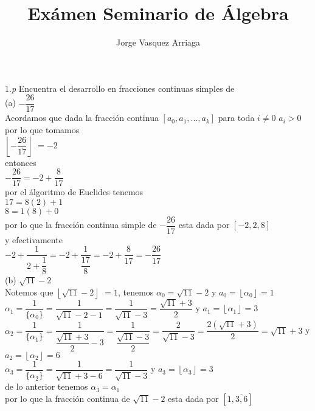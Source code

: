 \documentclass[11pt, article]{memoir}
\title{Exámen Seminario de Álgebra }
\author{Jorge Vasquez Arriaga}
\date{}
\begin{document}
\maketitle

1.\textit{p} Encuentra el desarrollo en fracciones continuas simples de \\

(a) $-\dfrac{26}{17}$\\

Acordamos que dada la fracción continua $[a_{0}, a_{1}, ..., a_{k}]$  para toda  $i\not=0$ $a_{i}>0$\\
por lo que tomamos \\
$\left\lfloor -\dfrac{26}{17} \right\rfloor$ $=-2$\\
entonces\\
$-\dfrac{26}{17}=-2+\dfrac{8}{17}$\\
por el álgoritmo de Euclides tenemos \\
$17=8(2)+1$ \\
$8=1(8)+0$\\
por lo que la fracción continua simple de $-\dfrac{26}{17}$ esta dada por $[-2,2,8]$\\
y efectivamente \\
$-2+\dfrac{1}{2+\dfrac{1}{8}}=-2+\dfrac{1}{\dfrac{17}{8}}=-2+\dfrac{8}{17}=-\dfrac{26}{17}$\\


(b) $\sqrt{11} -2$\\

Notemos que $\left\lfloor \sqrt{11} -2 \right\rfloor$ $=1$, tenemos $\alpha_{0}=\sqrt{11}-2$ y $a_{0}=\left\lfloor \alpha_{0} \right\rfloor=1$ \\
${\alpha_{1}}=\dfrac{1}{\{\alpha_{0}\}}=\dfrac{1}{\sqrt{11}-2-1}=\dfrac{1}{\sqrt{11}-3}=\dfrac{\sqrt{11}+3}{2}$ y $a_{1}=\left\lfloor \alpha_{1} \right\rfloor=3$ \\
${\alpha_{2}}=\dfrac{1}{\{\alpha_{1}\}}=\dfrac{1}{\dfrac{\sqrt{11}+3}{2}-3}=\dfrac{1}{\dfrac{\sqrt{11}-3}{2}}=\dfrac{2}{\sqrt{11}-3}=\dfrac{2(\sqrt{11}+3)}{2}=\sqrt{11}+3$  y $a_{2}=\left\lfloor \alpha_{2} \right\rfloor=6$  \\
${\alpha_{3}}=\dfrac{1}{\{\alpha_{2}\}}=\dfrac{1}{\sqrt{11}+3-6}=\dfrac{1}{\sqrt{11}-3}$ y $a_{3}=\left\lfloor \alpha_{3} \right\rfloor=3$\\
de lo anterior tenemos $\alpha_{3}=\alpha_{1}$\\
 por lo que la fracción continua de $\sqrt{11} -2$ esta dada por $[1,\overline{3,6}]$ 
\end{document}
